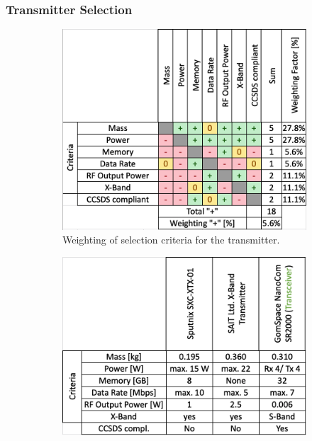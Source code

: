 \subsubsection{Transmitter Selection}
\begin{figure}[h]
     \centering
     \begin{subfigure}[b]{0.49\textwidth}
         \centering
         \includegraphics[width=\textwidth]{Media/Trade_off/Transmitter/Weighting_trans.png}
         \caption{Weighting of selection criteria for the transmitter.}
         \label{fig:Weighting_trans}
     \end{subfigure}
     \hfill
     \begin{subfigure}[b]{0.49\textwidth}
         \centering
         \includegraphics[width=\textwidth]{Media/Trade_off/Transmitter/Values_trans.png}

\end{subfigure}
\end{figure}
